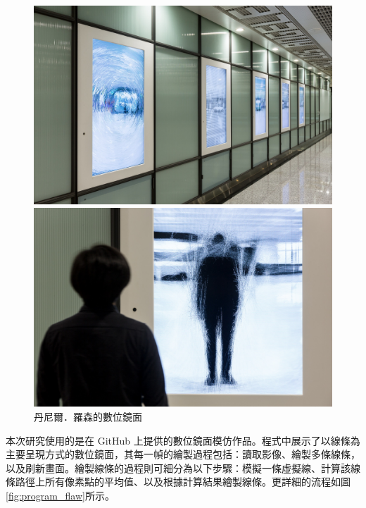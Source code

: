 \documentclass[12pt]{article}
\begin{document}
\begin{figure}[htbp]
  \centering
  \begin{minipage}[b]{0.45\textwidth}
    \centering
    \includegraphics[width=\textwidth]{img/mirror_example_2.jpg}
  \end{minipage}
  \hfill
  \begin{minipage}[b]{0.45\textwidth}
    \centering
    \includegraphics[width=\textwidth]{img/mirror_example_3.jpg}
  \end{minipage}
\caption{丹尼爾．羅森的數位鏡面}\label{fig:mirror_example_23}
\end{figure}

本次研究使用的是\textcite{github_mirror}在 GitHub 上提供的數位鏡面模仿作品。程式中展示了以線條為主要呈現方式的數位鏡面，其每一幀的繪製過程包括：讀取影像、繪製多條線條，以及刷新畫面。繪製線條的過程則可細分為以下步驟：模擬一條虛擬線、計算該線條路徑上所有像素點的平均值、以及根據計算結果繪製線條。更詳細的流程如圖\ref{fig:program_flaw}所示。
\end{document}
